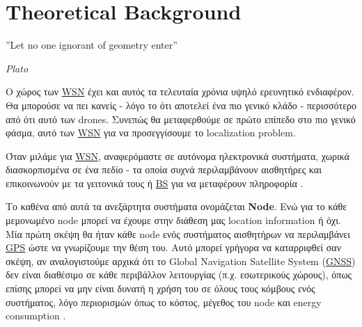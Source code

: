 \chapter{Theoretical Background} %
\label{chap:Chapter2} %
\epigraph{''Let no one ignorant of geometry enter” }{\textit{Plato}}

O χώρος των \hyperref[abbr:WSN]{WSN} έχει και αυτός τα τελευταία χρόνια υψηλό ερευνητικό ενδιαφέρον.
Θα μπορούσε να πει κανείς - λόγο το ότι αποτελεί ένα πιο γενικό κλάδο - περισσότερο από ότι αυτό των 
drones. Συνεπώς θα μεταφερθούμε σε πρώτο επίπεδο στο πιο γενικό φάσμα, αυτό των \hyperref[abbr:WSN]{WSN} 
για να προσεγγίσουμε το localization problem. 

Όταν μιλάμε για \hyperref[abbr:WSN]{WSN}, αναφερόμαστε σε αυτόνομα ηλεκτρονικά συστήματα, χωρικά διασκορπισμένα σε ένα πεδίο - τα οποία συχνά περιλαμβάνουν
αισθητήρες και επικοινωνούν με τα γειτονικά τους ή \hyperref[abbr:BS]{BS} για να μεταφέρουν πληροφορία \cite{wsn-wikipedia} \cite{farooqiazam2016location}.

Το καθένα από αυτά τα ανεξάρτητα συστήματα ονομάζεται \textbf{Node}. Ενώ για το κάθε μεμονωμένο node 
μπορεί να έχουμε στην διάθεση μας location information ή όχι. 
Μία πρώτη σκέψη θα ήταν κάθε node ενός συστήματος αισθητήρων να περιλαμβάνει \hyperref[abbr:GPS]{GPS} ώστε να γνωρίζουμε 
την θέση του. Αυτό μπορεί γρήγορα να καταρριφθεί σαν σκέψη, αν αναλογιστούμε αρχικά ότι το Global Navigation Satellite System (\hyperref[abbr:GNSS]{GNSS})
δεν είναι διαθέσιμο σε κάθε περιβάλλον λειτουργίας (π.χ. εσωτερικούς χώρους), όπως επίσης μπορεί να μην είναι δυνατή η χρήση του σε όλους τους κόμβους
ενός συστήματος, λόγο περιορισμών όπως το κόστος, μέγεθος του node και energy consumption \cite{farooqiazam2016location}.   

\begin{table}[H]
    \caption{Nodes' names definitions}
    \label{tab:nodes-names-definition}
	\centering
\end{table}

